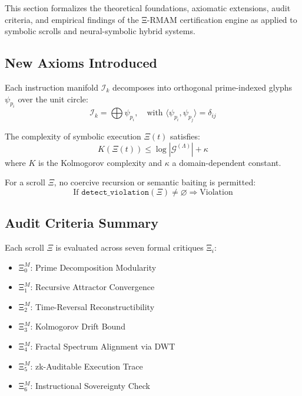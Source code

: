 \documentclass[12]{amsart}
\theoremstyle{plain}
\begin{document}
This section formalizes the theoretical foundations, axiomatic extensions, audit criteria, and empirical findings of the Ξ-RMAM certification engine as applied to symbolic scrolls and neural-symbolic hybrid systems.

\subsection{New Axioms Introduced}

\begin{axiom}
Each instruction manifold $\mathcal{I}_k$ decomposes into orthogonal prime-indexed glyphs $\psi_{p_i}$ over the unit circle:
\[
\mathcal{I}_k = \bigoplus \psi_{p_i}, \quad \text{with } \langle \psi_{p_i}, \psi_{p_j} \rangle = \delta_{ij}
\]
\end{axiom}

\begin{axiom}
The complexity of symbolic execution $\Xi(t)$ satisfies:
\[
K(\Xi(t)) \leq \log |\mathcal{G}^{(\Lambda)}| + \kappa
\]
where $K$ is the Kolmogorov complexity and $\kappa$ a domain-dependent constant.
\end{axiom}

\begin{axiom}
For a scroll $\Xi$, no coercive recursion or semantic baiting is permitted:
\[
\text{If } \texttt{detect\_violation}(\Xi) \ne \varnothing \Rightarrow \text{Violation}
\]
\end{axiom}

\subsection{Audit Criteria Summary}

Each scroll $\Xi$ is evaluated across seven formal critiques $\text{Ξ}_i$:

\begin{itemize}
    \item $\text{Ξ}_0^M$: Prime Decomposition Modularity
    \item $\text{Ξ}_1^M$: Recursive Attractor Convergence
    \item $\text{Ξ}_2^M$: Time-Reversal Reconstructibility
    \item $\text{Ξ}_3^M$: Kolmogorov Drift Bound
    \item $\text{Ξ}_4^M$: Fractal Spectrum Alignment via DWT
    \item $\text{Ξ}_5^M$: zk-Auditable Execution Trace
    \item $\text{Ξ}_6^M$: Instructional Sovereignty Check
\end{itemize}
\end{document}
